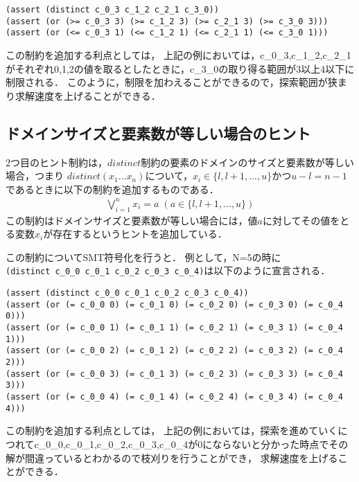 \begin{verbatim}
(assert (distinct c_0_3 c_1_2 c_2_1 c_3_0))
(assert (or (>= c_0_3 3) (>= c_1_2 3) (>= c_2_1 3) (>= c_3_0 3)))
(assert (or (<= c_0_3 1) (<= c_1_2 1) (<= c_2_1 1) (<= c_3_0 1)))
\end{verbatim}

この制約を追加する利点としては，
上記の例においては，c\_0\_3,c\_1\_2,c\_2\_1がそれぞれ0,1,2の値を取るとしたときに，c\_3\_0の取り得る範囲が3以上4以下に制限される．
このように，制限を加わえることができるので，探索範囲が狭まり求解速度を上げることができる．


\subsection{ドメインサイズと要素数が等しい場合のヒント}
2つ目のヒント制約は，$distinct$制約の要素のドメインのサイズと要素数が等しい場合，つまり
$distinct(x_1 ... x_n)$について，$x_i \in \{l, l+1, ..., u\}$かつ$u-l=n-1$であるときに以下の制約を追加するものである．\\
\begin{eqnarray}
\bigvee_{i=1}^n x_i=a \; (a \in \{l, l+1, ..., u\})
\label{eq:h2}
\end{eqnarray}
この制約はドメインサイズと要素数が等しい場合には，値$a$に対してその値をとる変数$x_i$が存在するというヒントを追加している．

この制約についてSMT符号化を行うと．
例として，N=5の時に\\
\verb|(distinct c_0_0 c_0_1 c_0_2 c_0_3 c_0_4)|は以下のように宣言される．

\begin{verbatim}
(assert (distinct c_0_0 c_0_1 c_0_2 c_0_3 c_0_4))
(assert (or (= c_0_0 0) (= c_0_1 0) (= c_0_2 0) (= c_0_3 0) (= c_0_4 0)))
(assert (or (= c_0_0 1) (= c_0_1 1) (= c_0_2 1) (= c_0_3 1) (= c_0_4 1)))
(assert (or (= c_0_0 2) (= c_0_1 2) (= c_0_2 2) (= c_0_3 2) (= c_0_4 2)))
(assert (or (= c_0_0 3) (= c_0_1 3) (= c_0_2 3) (= c_0_3 3) (= c_0_4 3)))
(assert (or (= c_0_0 4) (= c_0_1 4) (= c_0_2 4) (= c_0_3 4) (= c_0_4 4)))
\end{verbatim}


この制約を追加する利点としては，
上記の例においては，探索を進めていくにつれてc\_0\_0,c\_0\_1,c\_0\_2,c\_0\_3,c\_0\_4が0にならないと分かった時点でその解が間違っているとわかるので枝刈りを行うことができ，
求解速度を上げることができる．



%
%

